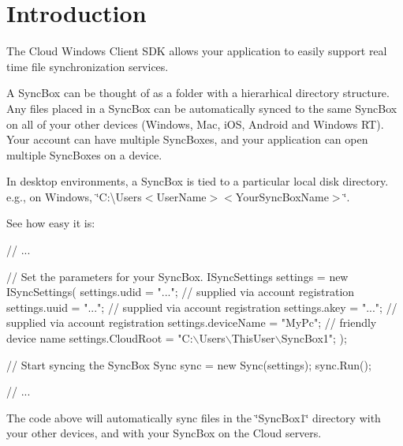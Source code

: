 \hypertarget{index_intro_sec}{}\section{Introduction}\label{index_intro_sec}
The Cloud Windows Client S\-D\-K allows your application to easily support real time file synchronization services.

A Sync\-Box can be thought of as a folder with a hierarhical directory structure. Any files placed in a Sync\-Box can be automatically synced to the same Sync\-Box on all of your other devices (Windows, Mac, i\-O\-S, Android and Windows R\-T). Your account can have multiple Sync\-Boxes, and your application can open multiple Sync\-Boxes on a device.

In desktop environments, a Sync\-Box is tied to a particular local disk directory. e.\-g., on Windows, \char`\"{}\-C\-:\textbackslash{}\-Users$<$\-User\-Name$>$$<$\-Your\-Sync\-Box\-Name$>$\char`\"{}.

See how easy it is\-:


\begin{DoxyCode}
\textcolor{comment}{// ...}

\textcolor{comment}{// Set the parameters for your SyncBox.}
ISyncSettings settings = \textcolor{keyword}{new} ISyncSettings(
            settings.udid = \textcolor{stringliteral}{"..."};          \textcolor{comment}{// supplied via account
       registration}
            settings.uuid = \textcolor{stringliteral}{"..."};          \textcolor{comment}{// supplied via account
       registration}
            settings.akey = \textcolor{stringliteral}{"..."};          \textcolor{comment}{// supplied via account
       registration}
            settings.deviceName = \textcolor{stringliteral}{"MyPc"};   \textcolor{comment}{// friendly device name}
            settings.CloudRoot = \textcolor{stringliteral}{"C:\(\backslash\)Users\(\backslash\)ThisUser\(\backslash\)SyncBox1"};
        );

\textcolor{comment}{// Start syncing the SyncBox}
Sync sync = \textcolor{keyword}{new} Sync(settings);
sync.Run();

\textcolor{comment}{// ...}
\end{DoxyCode}


The code above will automatically sync files in the \char`\"{}\-Sync\-Box1\char`\"{} directory with your other devices, and with your Sync\-Box on the Cloud servers.

